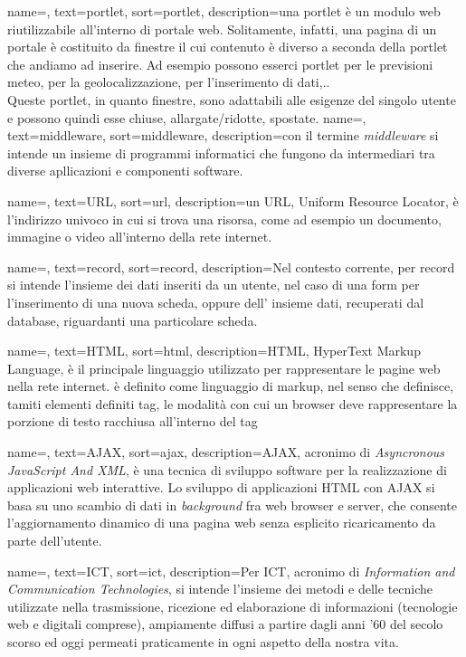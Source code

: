 {
	name=,
	text=portlet,
	sort=portlet,
	description={una portlet è un modulo web riutilizzabile all'interno di portale web. Solitamente, infatti, una pagina di un portale è costituito da finestre il cui contenuto è diverso a seconda della portlet che andiamo ad inserire. Ad esempio possono esserci portlet per le previsioni meteo, per la geolocalizzazione, per l'inserimento di dati,.. \\
	Queste portlet, in quanto finestre, sono adattabili alle esigenze del singolo utente e possono quindi esse chiuse, allargate/ridotte, spostate.}
}
{
	name=,
	text=middleware,
	sort=middleware,
	description={con il termine \emph{middleware} si intende un insieme di programmi informatici che fungono da intermediari tra diverse apllicazioni e componenti software.}
}

{name=,
text=URL,
sort=url,
description={un URL, Uniform Resource Locator, è l'indirizzo univoco in cui si trova una risorsa, come ad esempio un documento, immagine o video all'interno della rete internet.}
}

{name=,
	text=record,
	sort=record,
	description={Nel contesto corrente, per record si intende l'insieme dei dati inseriti da un utente, nel caso di una form per l'inserimento di una nuova scheda, oppure dell' insieme dati, recuperati dal database, riguardanti una particolare scheda.}
}

{name=,
	text=HTML,
	sort=html,
	description={HTML, HyperText Markup Language, è il principale linguaggio utilizzato per rappresentare le pagine web nella rete internet. è definito come linguaggio di markup, nel senso che definisce, tamiti elementi definiti tag, le modalità con cui un browser deve rappresentare la porzione di testo racchiusa all'interno del tag}
}

{name=,
	text=AJAX,
	sort=ajax,
	description={AJAX, acronimo di \emph{Asyncronous JavaScript And XML}, è una tecnica di sviluppo software per la realizzazione di applicazioni web interattive. Lo sviluppo di applicazioni HTML con AJAX si basa su uno scambio di dati in \emph{background} fra web browser e server, che consente l'aggiornamento dinamico di una pagina web senza esplicito ricaricamento da parte dell'utente.}
}

{name=,
	text=ICT,
	sort=ict,
	description={Per ICT, acronimo di \emph{Information and Communication Technologies}, si intende l'insieme dei metodi e delle tecniche utilizzate nella trasmissione, ricezione ed elaborazione di informazioni (tecnologie web e digitali comprese), ampiamente diffusi a partire dagli anni '60 del secolo scorso ed oggi permeati praticamente in ogni aspetto della nostra vita.}
}

